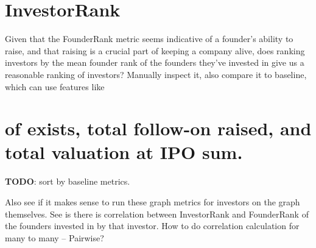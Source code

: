 \section{InvestorRank}

Given that the FounderRank metric seems indicative of a founder's ability to raise, and that raising is a crucial part of keeping a company alive, does ranking investors by the mean founder rank of the founders they've invested in give us a reasonable ranking of investors? Manually inspect it, also compare it to baseline, which can use features like \section{of exists, total follow-on raised, and total valuation at IPO sum.}

\textbf{TODO}: sort by baseline metrics.

Also see if it makes sense to run these graph metrics for investors on the graph themselves. See is there is correlation between InvestorRank and FounderRank of the founders invested in by that investor. How to do correlation calculation for many to many -- Pairwise?
